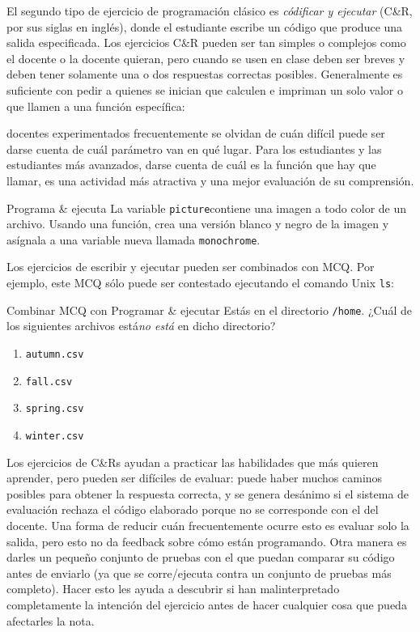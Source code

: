 El segundo tipo de ejercicio de programación clásico es \emph{códificar y ejecutar} (C\&R, por sus siglas en inglés),
donde el estudiante escribe un código que produce una salida especificada. 
Los ejercicios C\&R pueden ser tan simples o complejos como el docente o la docente quieran, pero cuando se usen en clase deben ser breves y deben tener solamente una o dos respuestas correctas posibles.
Generalmente es suficiente con pedir a quienes se inician que calculen e impriman un solo valor o que llamen a una función específica:

docentes experimentados frecuentemente se olvidan de cuán difícil puede ser darse cuenta de cuál parámetro van en qué lugar.
Para los estudiantes y las estudiantes  más avanzados, darse cuenta de cuál es la función que hay que llamar, es una actividad más atractiva y una mejor evaluación de su comprensión.

\begin{aside}{Programa \& ejecuta}
La variable \texttt{picture}contiene una imagen a todo color de un archivo.
Usando una función,
crea una versión blanco y negro de la imagen
y asígnala a una variable nueva llamada \texttt{monochrome}.
\end{aside}

Los ejercicios de escribir y ejecutar pueden ser combinados con MCQ.
Por ejemplo,
este MCQ sólo puede ser contestado ejecutando el comando Unix \texttt{ls}:

\begin{aside}{Combinar MCQ con Programar \& ejecutar}
  Estás en el directorio  \texttt{/home}.
  ¿Cuál de los siguientes archivos está\emph{no está} en dicho directorio?
  \begin{enumerate}
  \item
    \texttt{autumn.csv}
  \item
    \texttt{fall.csv}
  \item
    \texttt{spring.csv}
  \item
    \texttt{winter.csv}
  \end{enumerate}
\end{aside}

Los ejercicios de C\&Rs ayudan a practicar las habilidades que más quieren aprender,
pero pueden ser  difíciles de evaluar:
puede haber muchos caminos posibles para obtener la respuesta correcta,
y se genera desánimo si el sistema de evaluación rechaza el código elaborado porque no se corresponde con el del docente.
Una forma de reducir cuán frecuentemente ocurre esto es evaluar solo la salida,
pero esto no da feedback sobre cómo están programando.
Otra manera es darles un pequeño conjunto de pruebas con el que puedan comparar su código antes de enviarlo
(ya que se corre/ejecuta contra un conjunto de pruebas más completo).
Hacer esto les ayuda a descubrir si han malinterpretado completamente la intención del ejercicio antes de hacer cualquier cosa que pueda afectarles la nota.

